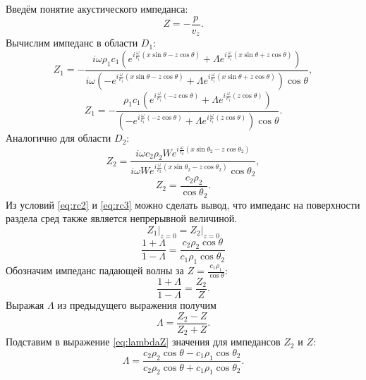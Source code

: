 \documentclass[a4paper, fontsize=14pt]{article}
\begin{document}
	Введём понятие акустического импеданса:
	\begin{equation}
		Z = -\frac{p}{v_z}.
	\end{equation}
	Вычислим импеданс в области $D_1$:
	\begin{equation}
		Z_1 = -\frac{i\omega \rho_1 c_1 (e^{i\frac{\omega}{c_1}(x\sin \theta - z\cos \theta)}+\Lambda e^{i\frac{\omega}{c_1}(x\sin \theta + z\cos \theta)})}{i\omega(-e^{i\frac{\omega}{c_1}(x\sin \theta - z\cos \theta)}+\Lambda e^{i\frac{\omega}{c_1}(x\sin \theta + z\cos \theta)}) \cos \theta },
	\end{equation}
	\begin{equation}
		Z_1 = -\frac{ \rho_1 c_1 (e^{i\frac{\omega}{c_1}(- z\cos \theta)}+\Lambda e^{i\frac{\omega}{c_1}( z\cos \theta)})}{(-e^{i\frac{\omega}{c_1}( - z\cos \theta)}+\Lambda e^{i\frac{\omega}{c_1}(z\cos \theta)}) \cos \theta }.
		\label{eq:impz1}
	\end{equation} 
	Аналогично для области $D_2$:
	\begin{equation}
		Z_2 = \frac{i\omega c_2 \rho_2 W e^{i\frac{\omega}{c_2}(x\sin \theta_2 - z\cos \theta_2)}}{i\omega W e^{i\frac{\omega}{c_2}(x\sin \theta_2 - z\cos \theta_2)}\cos \theta_2},
	\end{equation}
	\begin{equation}
		Z_2 = \frac{ c_2 \rho_2 }{ \cos \theta_2}.
	\end{equation}
	Из условий \eqref{eq:rc2} и \eqref{eq:rc3} можно сделать вывод, что импеданс на поверхности раздела сред также является непрерывной величиной.
	\begin{equation}
		\left.Z_1\right|_{z=0} = \left. Z_2 \right|_{z=0}
	\end{equation}
	\begin{equation}
		\frac{1+\Lambda }{1-\Lambda } = \frac{c_2 \rho_2 \cos \theta }{c_1 \rho_1 \cos \theta_2 }
	\end{equation}
	Обозначим импеданс падающей волны за $Z = \frac{c_1\rho_1}{\cos \theta}$:
	\begin{equation}
		\frac{1+\Lambda }{1-\Lambda } = \frac{Z_2 }{Z}.
	\end{equation}
	Выражая $\Lambda $ из предыдущего выражения получим
	\begin{equation}
		\Lambda =\frac{Z_2-Z}{Z_2+Z}.
		\label{eq:lambdaZ}
	\end{equation}
	Подставим в выражение \eqref{eq:lambdaZ} значения для импедансов $Z_2$ и $Z$:
	\begin{equation}
		\Lambda = \frac{c_2 \rho_2 \cos \theta - c_1 \rho_1 \cos \theta_2}{c_2 \rho_2 \cos \theta + c_1 \rho_1 \cos \theta_2}.
		\label{eq:lambda}
	\end{equation}
\end{document}
